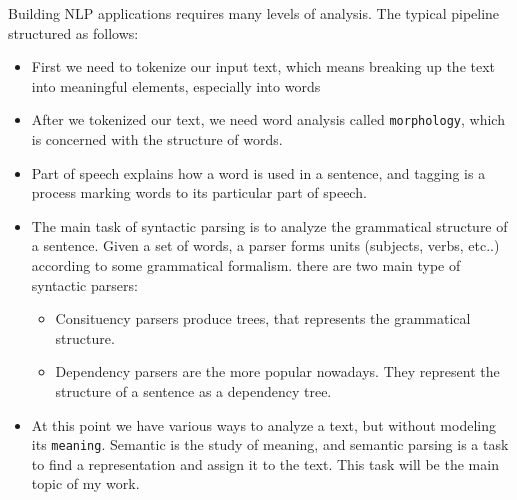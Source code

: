 Building NLP applications requires many levels of analysis.
The typical pipeline structured as follows:
\begin{itemize}
	\item First we need to tokenize our input text, which means breaking up the text into meaningful elements, especially into words
    \item After we tokenized our text, we need word analysis called \texttt{morphology}, which is concerned with the structure of words.
    \item Part of speech explains how a word is used in a sentence, and tagging is a process marking words to its particular part of speech.
    \item The main task of syntactic parsing is to analyze the grammatical structure of a sentence. Given a set of words, a parser forms units (subjects, verbs, etc..) according to some grammatical formalism.
    there are two main type of syntactic parsers:
    \begin{itemize}
        \item Consituency parsers produce trees, that represents the grammatical structure.
        \item Dependency parsers are the more popular nowadays. They represent the structure of a sentence as a dependency tree.
    \end{itemize}
    \item At this point we have various ways to analyze a text, but without modeling its \texttt{meaning}. Semantic is the study of meaning, and semantic parsing is a task to find a representation and assign it to the text. This task will be the main topic of my work.
\end{itemize}

